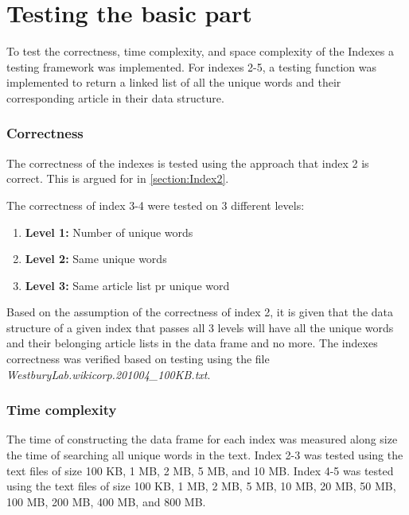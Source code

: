 \section{Testing the basic part}
To test the correctness, time complexity, and space complexity of the Indexes a testing framework was implemented. For indexes 2-5, a testing function was implemented to return a linked list of all the unique words and their corresponding article in their data structure.

\subsubsection{Correctness}
The correctness of the indexes is tested using the approach that index 2 is correct. This is argued for in \ref{section:Index2}.

The correctness of index 3-4 were tested on 3 different levels:

\begin{enumerate}
    \item[] \textbf{Level 1:} Number of unique words 
    \item[] \textbf{Level 2:} Same unique words
    \item[] \textbf{Level 3:} Same article list pr unique word
\end{enumerate}

Based on the assumption of the correctness of index 2, it is given that the data structure of a given index that passes all 3 levels will have all the unique words and their belonging article lists in the data frame and no more. The indexes correctness was verified based on testing using the file \textit{WestburyLab.wikicorp.201004\_100KB.txt}.

\subsubsection{Time complexity}
The time of constructing the data frame for each index was measured along size the time of searching all unique words in the text. Index 2-3 was tested using the text files of size 100 KB, 1 MB, 2 MB, 5 MB, and 10 MB. Index 4-5 was tested using the text files of size 100 KB, 1 MB, 2 MB, 5 MB, 10 MB, 20 MB, 50 MB, 100 MB, 200 MB, 400 MB, and 800 MB.







